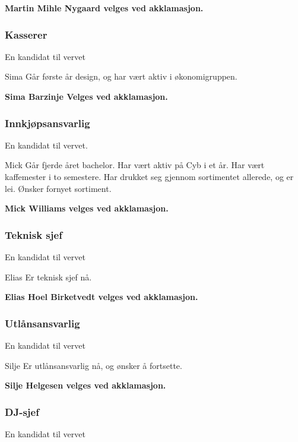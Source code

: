 \documentclass[10pt,norsk,a4paper,usenames,dvipsnames]{article}
\begin{document}
\begin{multicols}
            \textbf{Martin Mihle Nygaard velges ved akklamasjon.}

        \subsubsection{Kasserer}
            En kandidat til vervet

            Sima
            Går første år design, og har vært aktiv i økonomigruppen.

            \textbf{Sima Barzinje Velges ved akklamasjon.}

        \subsubsection{Innkjøpsansvarlig}
            En kandidat til vervet.

            Mick
            Går fjerde året bachelor. Har vært aktiv på Cyb i et år. Har vært kaffemester i to semestere. Har drukket seg gjennom sortimentet allerede, og er lei. Ønsker fornyet sortiment.

            \textbf{Mick Williams velges ved akklamasjon.}

        \subsubsection{Teknisk sjef}
            En kandidat til vervet

            Elias
            Er teknisk sjef nå.

            \textbf{Elias Hoel Birketvedt velges ved akklamasjon.}

        \subsubsection{Utlånsansvarlig}

            En kandidat til vervet

            Silje
            Er utlånsansvarlig nå, og ønsker å fortsette.

            \textbf{Silje Helgesen velges ved akklamasjon.}


        \subsubsection{DJ-sjef}
            En kandidat til vervet


\end{multicols}
\end{document}
